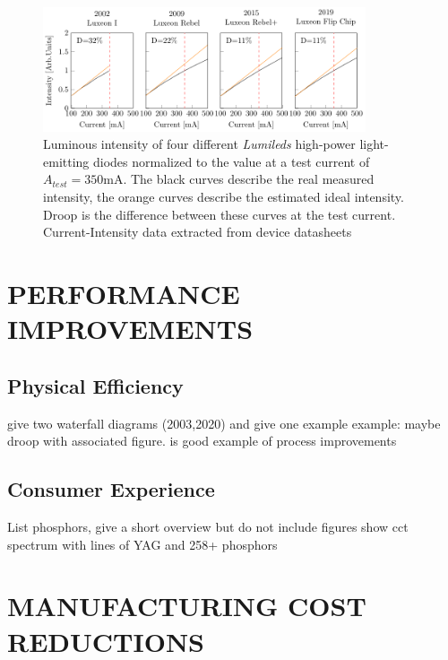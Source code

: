 \documentclass[a4paper,nocompress]{spie}  %
\begin{document}
\begin{figure} [ht]
    \begin{center}
        \includegraphics[width=0.85\textwidth]{SPIE/article/droop_lumileds.pdf}
    \end{center}
    \caption{Luminous intensity of four different \textit{Lumileds} high-power light-emitting diodes normalized to the value at a test current of $A_{test}=350$mA. The black curves describe the real measured intensity, the orange curves describe the estimated ideal intensity. Droop is the difference between these curves at the test current. Current-Intensity data extracted from device datasheets \cite{datasheet_lumileds_lux1,datasheet_lumileds_rebel,datasheet_lumileds_rebplus,lumi2019data}}
    \label{fig:chip_arch}
\end{figure}

\section{PERFORMANCE IMPROVEMENTS}



\subsection{Physical Efficiency}

give two waterfall diagrams (2003,2020) and give one example
example: maybe droop with associated figure. is good example of process improvements

\subsection{Consumer Experience}

List phosphors, give a short overview but do not include figures
show cct spectrum with lines of YAG and 258+ phosphors

\section{MANUFACTURING COST REDUCTIONS}
\end{document}
